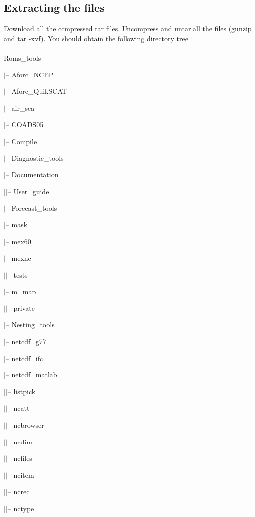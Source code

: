 \subsection{Extracting the files}

Download all the compressed tar files. Uncompress and untar all 
the files (gunzip and tar -xvf). You should obtain the following 
directory tree : \\
\\
Roms\_tools

$|$-- Aforc\_NCEP

$|$-- Aforc\_QuikSCAT

$|$-- air\_sea 

$|$-- COADS05  

$|$-- Compile

$|$-- Diagnostic\_tools

$|$-- Documentation

$|$\hspace{0.5cm}$|$-- User\_guide

$|$-- Forecast\_tools

$|$-- mask

$|$-- mex60

$|$-- mexnc

$|$\hspace{0.5cm}$|$-- tests

$|$-- m\_map

$|$\hspace{0.5cm}$|$-- private

$|$-- Nesting\_tools

$|$-- netcdf\_g77

$|$-- netcdf\_ifc

$|$-- netcdf\_matlab

$|$\hspace{0.5cm}$|$-- listpick

$|$\hspace{0.5cm}$|$-- ncatt

$|$\hspace{0.5cm}$|$-- ncbrowser

$|$\hspace{0.5cm}$|$-- ncdim

$|$\hspace{0.5cm}$|$-- ncfiles

$|$\hspace{0.5cm}$|$-- ncitem

$|$\hspace{0.5cm}$|$-- ncrec

$|$\hspace{0.5cm}$|$-- nctype

